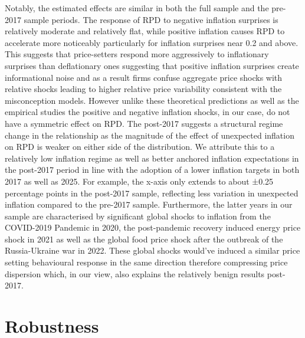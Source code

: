 \documentclass[
  letterpaper,
  DIV=11,
  numbers=noendperiod]{scrartcl}
\begin{document}
Notably, the estimated effects are similar in both the full sample and
the pre-2017 sample periods. The response of RPD to negative inflation
surprises is relatively moderate and relatively flat, while positive
inflation causes RPD to accelerate more noticeably particularly for
inflation surprises near 0.2 and above. This suggests that price-setters
respond more aggressively to inflationary surprises than deflationary
ones suggesting that positive inflation surprises create informational
noise and as a result firms confuse aggregate price shocks with relative
shocks leading to higher relative price variability consistent with the
misconception models. However unlike these theoretical predictions as
well as the empirical studies
\citep{caraballo2013, becker2012, sara-zaror2024} the positive and
negative inflation shocks, in our case, do not have a symmetric effect
on RPD. The post-2017 suggests a structural regime change in the
relationship as the magnitude of the effect of unexpected inflation on
RPD is weaker on either side of the distribution. We attribute this to a
relatively low inflation regime as well as better anchored inflation
expectations \citep{durand2023} in the post-2017 period in line with the
adoption of a lower inflation targets in both 2017 as well as 2025. For
example, the x-axis only extends to about ±0.25 percentage points in the
post-2017 sample, reflecting less variation in unexpected inflation
compared to the pre-2017 sample. Furthermore, the latter years in our
sample are characterised by significant global shocks to inflation from
the COVID-2019 Pandemic in 2020, the post-pandemic recovery induced
energy price shock in 2021 as well as the global food price shock after
the outbreak of the Russia-Ukraine war in 2022. These global shocks
would've induced a similar price setting behavioural response in the
same direction therefore compressing price dispersion
\citep{nakamura2018} which, in our view, also explains the relatively
benign results post-2017.

\section{Robustness}\label{robustness}
\end{document}
